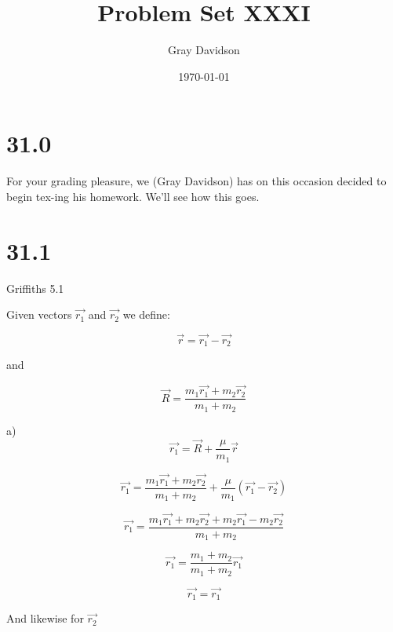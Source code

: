 \documentclass[aps,pre,nofootinbib]{revtex4}
\begin{document}
\title{Problem Set XXXI}

\author{Gray Davidson}
\date{\today}
\maketitle

\section{31.0}
For your grading pleasure, we (Gray Davidson) has on this occasion decided to begin tex-ing his homework.  We'll see how this goes.  

\section{31.1}
Griffiths 5.1

\bigskip
Given vectors $\vec{r_1}$ and $\vec{r_2}$ we define: 

\begin{equation}
\vec{r} = \vec{r_1}-\vec{r_2}
\end{equation}

and 

\begin{equation}
\vec{R} = \frac{m_1 \vec{r_1} + m_2 \vec{r_2}}{m_1 + m_2}
\end{equation}

a)
\begin{equation}
\vec{r_1} = \vec{R}+\frac{\mu}{m_1} \vec{r}
\end{equation}

\begin{equation}
\vec{r_1} =\frac{m_1 \vec{r_1} + m_2 \vec{r_2}}{m_1 + m_2}+\frac{\mu}{m_1}(\vec{r_1}-\vec{r_2})
\end{equation}

\begin{equation}
\vec{r_1} =\frac{m_1 \vec{r_1} + m_2 \vec{r_2} + m_2 \vec{r_1} - m_2\vec{r_2}}{m_1 + m_2}
\end{equation}

\begin{equation}
\vec{r_1} =\frac{m_1 + m_2}{m_1 + m_2}\vec{r_1}
\end{equation}

\begin{equation}
\vec{r_1} =\vec{r_1}
\end{equation}

And likewise for $\vec{r_2}$
\end{document}
